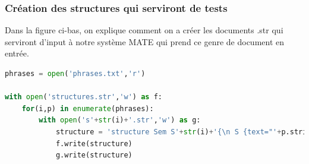 \subsubsection{Création des structures qui serviront de tests}

Dans la figure ci-bas, on explique comment on a créer les documents .str qui serviront d'input à notre système MATE qui prend ce genre de document en entrée.

\begin{lstlisting}[language=Python, caption = code pour créer des structures .str]
phrases = open('phrases.txt','r')

with open('structures.str','w') as f:
    for(i,p) in enumerate(phrases):
        with open('s'+str(i)+'.str','w') as g:
            structure = 'structure Sem S'+str(i)+'{\n S {text="'+p.strip()+'"\n\n main-> \n }\n}'
            f.write(structure)
            g.write(structure)
\end{lstlisting}

